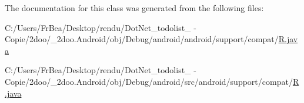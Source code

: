 The documentation for this class was generated from the following files:\begin{CompactItemize}
\item 
C:/Users/FrBea/Desktop/rendu/DotNet\_\-todolist\_ - Copie/2doo/\_\-2doo.Android/obj/Debug/android/android/support/compat/\hyperlink{android_2support_2compat_2_r_8java}{R.java}\item 
C:/Users/FrBea/Desktop/rendu/DotNet\_\-todolist\_ - Copie/2doo/\_\-2doo.Android/obj/Debug/android/src/android/support/compat/\hyperlink{src_2android_2support_2compat_2_r_8java}{R.java}\end{CompactItemize}
